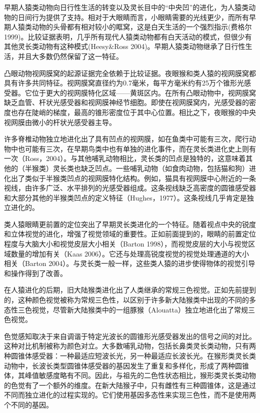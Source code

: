 早期人猿类动物向日行性生活的转变以及灵长目中的“中央凹”的进化，为人猿类动物的日间行为提供了支持。相对于大眼睛而言，小眼睛需要的光线更少，而所有早期人猿类动物的头骨都有相对较小的眶窝，这是白天生活的一个强烈指示(费格尔1999)。比较证据表明，几乎所有现代人猿类动物都有白天活动的模式，但很少有其他灵长类动物有这种模式(Heesy\&Ross 2004)。早期人猿类动物继承了日行性生活，并且大多数仍然保留了这一特征。

凸眼动物视网膜窝的起源证据完全依赖于比较证据。夜眼猴和类人猿的视网膜窝都具有许多共同特征。视网膜窝直径约为0.7毫米，每平方毫米约有25万个锥形光感受器。它位于更大的视网膜特化区域——黄斑区内。在所有凸眼动物中，视网膜窝缺乏血管、杆状光感受器和视网膜神经节细胞。即使在视网膜窝内，光感受器的密度也存在陡峭的梯度，最高的锥形密度位于其中心位置。相比之下，夜眼猴的中央视网膜由微小的杆状光感受器主导。

许多脊椎动物独立地进化出了具有凹点的视网膜，如在鱼类中可能有三次，爬行动物中也可能有三次，在早期鸟类中也有单独的进化事件，而在灵长类进化史上则有一次（Ross，2004）。与其他哺乳动物相比，灵长类的凹点是独特的，这意味着其他的（半猴类）灵长类也缺乏凹点。一些哺乳动物（如食肉动物，包括猫和狗）进化出了类似于半猴类凹点的视网膜特化结构。例如，猫具有视网膜中心附近的一条视线，由许多广泛、水平排列的光感受器组成。这条视线缺乏高密度的圆锥感受器和大部分其他的半猴类凹点的定义特征（Hughes，1977）。这条视线几乎肯定是独立进化的。

类人猿眼睛更前置的定位突出了早期灵长类进化的一个特征。随着视点中央的锐度和立体视觉的进化，增强了视觉领域的重要性。正如前面提到的，眼睛的前置定位程度与大脑大小和视觉皮层大小相关（Barton 1998），而视觉皮层的大小与视觉区域数量的增加有关（Kaas 2006）。它还与处理高锐度视觉的视觉处理通道的大小相关（Barton 2004）。与灵长类一般一样，这些类人猿的进步使得物体的视觉引导和操作得到了改善。

在人猿进化的后期，旧大陆猴类进化出了人类继承的常规三色视觉。正如先前提到的，这种颜色视觉被称为常规三色性，以区别于许多新大陆猴类中出现的不同的多态性三色视觉，尽管新大陆猴类中的一组豚猴（Alouatta）独立地进化出了常规三色视觉。

色觉感知取决于来自调谐于特定光波长的圆锥形光感受器发出的信号之间的对比。这种对比机制被称为颜色对立。大多数哺乳动物，包括长鼻类灵长类动物，只有两种圆锥体感受器：一种最适应短波长光，另一种最适应长波长光。在猴形类灵长类动物中，长波长类型圆锥体感受器的基因发生了重复和多样化，形成了两种圆锥体，其峰值敏感度略有不同。因此，与祖先的二色性状态相比，猴形类灵长类动物的色觉有了一个额外的维度。在新大陆猴子中，只有雌性有三种圆锥体，这是通过不同而独立进化的过程实现的。它们使用基因多态性来实现三色性，而不是使用两个不同的基因。

